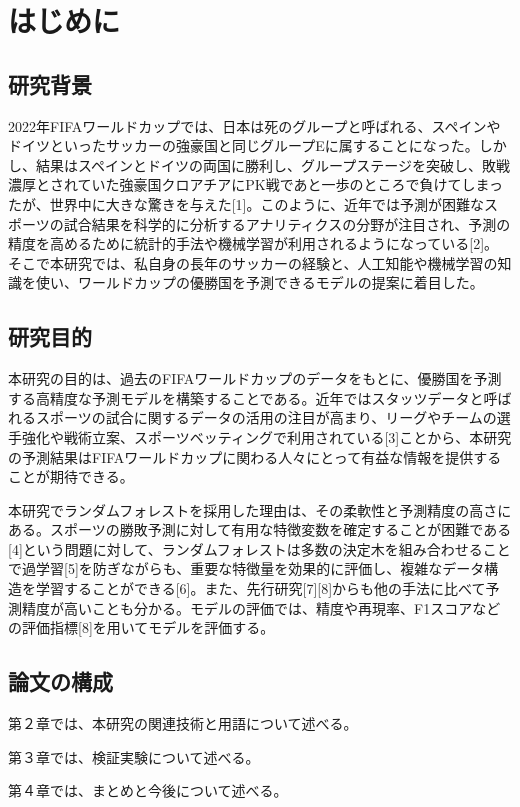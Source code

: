 \documentclass[platex]{suribt}
\begin{document}
\setcounter{tocdepth}{2}
\tableofcontents%
\mainmatter%
\chapter{はじめに}
\section{研究背景}
2022年FIFAワールドカップでは、日本は死のグループと呼ばれる、スペインやドイツといったサッカーの強豪国と同じグループEに属することになった。しかし、結果はスペインとドイツの両国に勝利し、グループステージを突破し、敗戦濃厚とされていた強豪国クロアチアにPK戦であと一歩のところで負けてしまったが、世界中に大きな驚きを与えた[1]。このように、近年では予測が困難なスポーツの試合結果を科学的に分析するアナリティクスの分野が注目され、予測の精度を高めるために統計的手法や機械学習が利用されるようになっている[2]。そこで本研究では、私自身の長年のサッカーの経験と、人工知能や機械学習の知識を使い、ワールドカップの優勝国を予測できるモデルの提案に着目した。
\section{研究目的}
本研究の目的は、過去のFIFAワールドカップのデータをもとに、優勝国を予測する高精度な予測モデルを構築することである。近年ではスタッツデータと呼ばれるスポーツの試合に関するデータの活用の注目が高まり、リーグやチームの選手強化や戦術立案、スポーツベッティングで利用されている[3]ことから、本研究の予測結果はFIFAワールドカップに関わる人々にとって有益な情報を提供することが期待できる。\par
本研究でランダムフォレストを採用した理由は、その柔軟性と予測精度の高さにある。スポーツの勝敗予測に対して有用な特徴変数を確定することが困難である[4]という問題に対して、ランダムフォレストは多数の決定木を組み合わせることで過学習[5]を防ぎながらも、重要な特徴量を効果的に評価し、複雑なデータ構造を学習することができる[6]。また、先行研究[7][8]からも他の手法に比べて予測精度が高いことも分かる。モデルの評価では、精度や再現率、F1スコアなどの評価指標[8]を用いてモデルを評価する。
\section{論文の構成}
第２章では、本研究の関連技術と用語について述べる。\par
第３章では、検証実験について述べる。\par
第４章では、まとめと今後について述べる。
\end{document}
